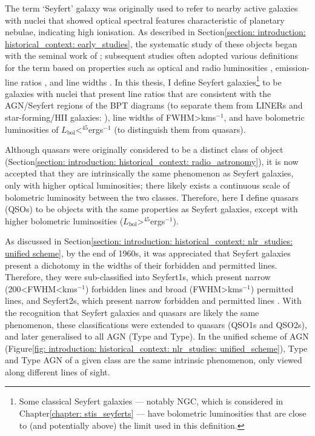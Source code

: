 The term `Seyfert' galaxy was originally used to refer to nearby active galaxies with nuclei that showed optical spectral features characteristic of planetary nebulae, indicating high ionisation. As described in Section\;\ref{section: introduction: historical_context: early_studies}, the systematic study of these objects began with the seminal work of \citet{Seyfert1943}; subsequent studies often adopted various definitions for the term based on properties such as optical and radio luminosities \citep{Wilson1980}, emission-line ratios \citep{Baldwin1981}, and line widths \citep{Whittle1992a}. In this thesis, I define Seyfert galaxies\footnote{Some classical Seyfert galaxies --- notably NGC, which is considered in Chapter\;\ref{chapter: stis_seyferts} --- have bolometric luminosities that are close to (and potentially above) the limit used in this definition.} to be galaxies with nuclei that present line ratios that are consistent with the AGN/Seyfert regions of the BPT diagrams (to separate them from LINERs and star-forming/HII galaxies: \citealt{Baldwin1981, Kewley2006}), line widths of FWHM\;\textgreater{}\;km\;s$^{-1}$, and have bolometric luminosities of $L_\mathrm{bol}$\;\textless{}$^{45}$\;erg\;s$^{-1}$ (to distinguish them from quasars).

Although quasars were originally considered to be a distinct class of object (Section\;\ref{section: introduction: historical_context: radio_astronomy}), it is now accepted that they are intrinsically the same phenomenon as Seyfert galaxies, only with higher optical luminosities; there likely exists a continuous scale of bolometric luminosity between the two classes. Therefore, here I define quasars (QSOs) to be objects with the same properties as Seyfert galaxies, except with higher bolometric luminosities ($L_\mathrm{bol}$\;\textgreater{}$^{45}$\;erg\;s$^{-1}$).

As discussed in Section\;\ref{section: introduction: historical_context: nlr_studies: unified scheme}, by the end of 1960s, it was appreciated that Seyfert galaxies present a dichotomy in the widths of their forbidden and permitted lines. Therefore, they were sub-classified into Seyfert\;1s, which present narrow (200\;\textless\;FWHM\;\textless{}\;km\;s$^{-1}$) forbidden lines and broad (FWHM\;\textgreater{}\;km\;s$^{-1}$) permitted lines, and Seyfert\;2s, which present narrow forbidden and permitted lines \citep{Khachikian1971}. With the recognition that Seyfert galaxies and quasars are likely the same phenomenon, these classifications were extended to quasars (QSO1s and QSO2s), and later generalised to all AGN (Type and Type). In the unified scheme of AGN (Figure\;\ref{fig: introduction: historical_context: nlr_studies: unified_scheme}), Type and Type AGN of a given class are the same intrinsic phenomenon, only viewed along different lines of sight.

